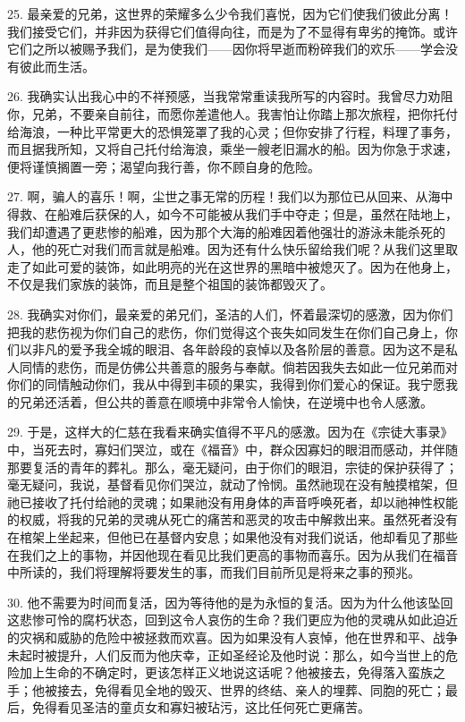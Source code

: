25. 最亲爱的兄弟，这世界的荣耀多么少令我们喜悦，因为它们使我们彼此分离！我们接受它们，并非因为获得它们值得向往，而是为了不显得有卑劣的掩饰。或许它们之所以被赐予我们，是为使我们——因你将早逝而粉碎我们的欢乐——学会没有彼此而生活。\par

26. 我确实认出我心中的不祥预感，当我常常重读我所写的内容时。我曾尽力劝阻你，兄弟，不要亲自前往，而愿你差遣他人。我害怕让你踏上那次旅程，把你托付给海浪，一种比平常更大的恐惧笼罩了我的心灵；但你安排了行程，料理了事务，而且据我所知，又将自己托付给海浪，乘坐一艘老旧漏水的船。因为你急于求速，便将谨慎搁置一旁；渴望向我行善，你不顾自身的危险。\par

27. 啊，骗人的喜乐！啊，尘世之事无常的历程！我们以为那位已从回来、从海中得救、在船难后获保的人，如今不可能被从我们手中夺走；但是，虽然在陆地上，我们却遭遇了更悲惨的船难，因为那个大海的船难因着他强壮的游泳未能杀死的人，他的死亡对我们而言就是船难。因为还有什么快乐留给我们呢？从我们这里取走了如此可爱的装饰，如此明亮的光在这世界的黑暗中被熄灭了。因为在他身上，不仅是我们家族的装饰，而且是整个祖国的装饰都毁灭了。\par

28. 我确实对你们，最亲爱的弟兄们，圣洁的人们，怀着最深切的感激，因为你们把我的悲伤视为你们自己的悲伤，你们觉得这个丧失如同发生在你们自己身上，你们以非凡的爱予我全城的眼泪、各年龄段的哀悼以及各阶层的善意。因为这不是私人同情的悲伤，而是仿佛公共善意的服务与奉献。倘若因我失去如此一位兄弟而对你们的同情触动你们，我从中得到丰硕的果实，我得到你们爱心的保证。我宁愿我的兄弟还活着，但公共的善意在顺境中非常令人愉快，在逆境中也令人感激。\par

29. 于是，这样大的仁慈在我看来确实值得不平凡的感激。因为在《宗徒大事录》中，当死去时，寡妇们哭泣，或在《福音》中，群众因寡妇的眼泪而感动，并伴随那要复活的青年的葬礼。那么，毫无疑问，由于你们的眼泪，宗徒的保护获得了；毫无疑问，我说，基督看见你们哭泣，就动了怜悯。虽然祂现在没有触摸棺架，但祂已接收了托付给祂的灵魂；如果祂没有用身体的声音呼唤死者，却以祂神性权能的权威，将我的兄弟的灵魂从死亡的痛苦和恶灵的攻击中解救出来。虽然死者没有在棺架上坐起来，但他已在基督内安息；如果他没有对我们说话，他却看见了那些在我们之上的事物，并因他现在看见比我们更高的事物而喜乐。因为从我们在福音中所读的，我们将理解将要发生的事，而我们目前所见是将来之事的预兆。\par

30. 他不需要为时间而复活，因为等待他的是为永恒的复活。因为为什么他该坠回这悲惨可怜的腐朽状态，回到这令人哀伤的生命？我们更应为他的灵魂从如此迫近的灾祸和威胁的危险中被拯救而欢喜。因为如果没有人哀悼，他在世界和平、战争未起时被提升，人们反而为他庆幸，正如圣经论及他时说：那么，如今当世上的危险加上生命的不确定时，更该怎样正义地说这话呢？他被接去，免得落入蛮族之手；他被接去，免得看见全地的毁灭、世界的终结、亲人的埋葬、同胞的死亡；最后，免得看见圣洁的童贞女和寡妇被玷污，这比任何死亡更痛苦。\par

